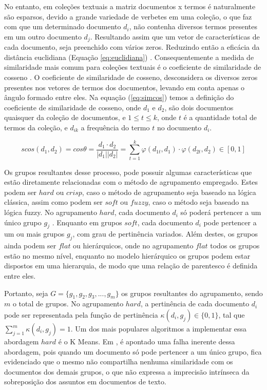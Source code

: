 No entanto, em coleções textuais a matriz documentos x termos é naturalmente são esparsos, 
devido a grande variedade de 
verbetes em uma coleção, o que faz com que um determinado documento $d_{i}$, não contenha diversos
termos presentes em um outro documento $d_{j}$. Resultando assim que um vetor de características de 
cada documento, seja preenchido com vários zeros. Reduzindo então a eficácia da distância 
euclidiana (Equação \ref{eq:euclidiana})
\cite{Nogueira2013}. Consequentemente a medida de similaridade mais comum para coleções textuais
é o coeficiente de similaridade de cosseno \cite{Nogueira2013}\cite{Feldman2007}. O coeficiente
de similaridade de cosseno, desconsidera os diversos zeros presentes nos vetores de termos 
dos documentos, levando em conta apenas o ângulo formado entre eles\cite{Nogueira2013}.
Na equação (\ref{eq:simcos}) temos a definição do coeficiente de similaridade de cosseno, onde 
$d_1$ e $d_2$, são dois documentos quaisquer da coleção de documentos, e $1 \leq t \leq k$, onde 
$t$ é a quantidade total de termos da coleção, e $d_{ik}$ a frequência do termo $t$ no documento $d_i$.

\begin{equation}
  scos(d_{1}, d_{2}) = cos\theta = \frac{d_{1} \cdot d_{2}}{|d_{1}||d_{2}|} = \sum_{t=1}^k{\varphi(d_{1t},d_1) \cdot \varphi(d_{2t},d_2)} \in [0,1]
  \label{eq:simcos}
\end{equation}

Os grupos resultantes desse processo, pode possuir algumas características que estão diretamente
relacionadas com o método de agrupamento empregado. Estes podem ser $hard$ ou $crisp$, caso 
o método de agrupamento seja baseado na lógica clássica, assim como podem ser $soft$ ou $fuzzy$, 
caso o método seja baseado na lógica fuzzy. No agrupamento $hard$, cada documento 
$d_{i}$ só poderá pertencer a um único grupo $g_{j}$ \cite{Bezdek1984}. Enquanto em grupos $soft$,
cada documento $d_{i}$ pode pertencer a um ou mais grupos $g_{j}$, com grau de pertinência variados.
Além destes, os grupos ainda podem ser $flat$ ou hierárquicos, onde no agrupamento $flat$
todos os grupos estão no mesmo nível, enquanto no modelo hierárquico os grupos podem estar dispostos
em uma hierarquia, de modo que uma relação de parentesco é definida entre eles.

Portanto, seja $G = \{g_{1},g_{2},g_{3},...,g_{m}\}$ os grupos resultantes do agrupamento, 
sendo $m$ o total de grupos. No agrupamento $hard$, a pertinência de cada 
documento $d_{i}$ pode ser representada pela função de pertinência 
$\kappa(d_{i}, g_{j}) \in \{0,1\}$, tal que $\sum_{j=1}^m \kappa(d_{i}, g_{j}) = 1$. 
Um dos mais populares algoritmos a implementar essa abordagem $hard$ é o K Means.
Em \cite{Bezdek1984}\cite{Nogueira2013}\cite{Feldman2007}, é apontado uma falha inerente dessa
abordagem, pois quando um documento só pode pertencer a um único grupo, fica evidenciado que o mesmo
não compartilha nenhuma similaridade com os documentos dos demais grupos, o que não expressa a
imprecisão intrínseca da sobreposição dos assuntos em documentos de texto.

